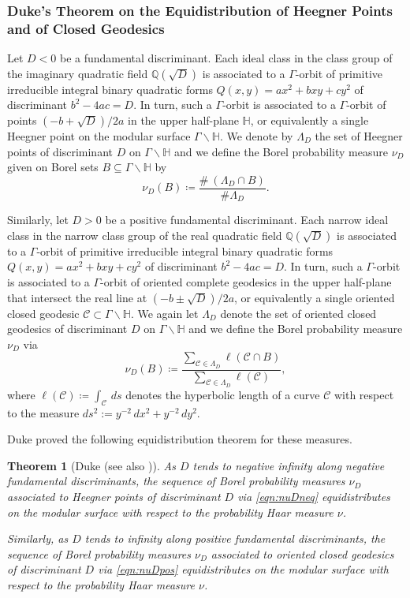 \documentclass[11pt,a4paper]{amsart}
\newcommand{\CC}{\mathcal{C}}
\newcommand{\Hb}{\mathbb{H}}
\newcommand{\Q}{\mathbb{Q}}
\numberwithin{equation}{section}
\newtheorem{theorem}[equation]{Theorem}
\theoremstyle{remark}
\theoremstyle{definition}
\begin{document}
\subsubsection{Duke's Theorem on the Equidistribution of Heegner Points and of Closed Geodesics}

Let $D < 0$ be a fundamental discriminant. Each ideal class in the class group of the imaginary quadratic field $\Q(\sqrt{D})$ is associated to a $\Gamma$-orbit of primitive irreducible integral binary quadratic forms $Q(x,y) = ax^2 + bxy + cy^2$ of discriminant $b^2 - 4ac = D$. In turn, such a $\Gamma$-orbit is associated to a $\Gamma$-orbit of points $(-b + \sqrt{D})/2a$ in the upper half-plane $\Hb$, or equivalently a single Heegner point on the modular surface $\Gamma \backslash \Hb$. We denote by $\Lambda_D$ the set of Heegner points of discriminant $D$ on $\Gamma \backslash \Hb$ and we define the Borel probability measure $\nu_D$ given on Borel sets $B \subseteq \Gamma \backslash \Hb$ by
\begin{equation}
\label{eqn:nuDneq}
\nu_D(B) \coloneqq \frac{\#\ (\Lambda_D \cap B)}{\# \Lambda_D}.
\end{equation}

Similarly, let $D > 0$ be a positive fundamental discriminant. Each narrow ideal class in the narrow class group of the real quadratic field $\Q(\sqrt{D})$ is associated to a $\Gamma$-orbit of primitive irreducible integral binary quadratic forms $Q(x,y) = ax^2 + bxy + cy^2$ of discriminant $b^2 - 4ac = D$. In turn, such a $\Gamma$-orbit is associated to a $\Gamma$-orbit of oriented complete geodesics in the upper half-plane that intersect the real line at $(-b \pm \sqrt{D})/2a$, or equivalently a single oriented closed geodesic $\CC \subset \Gamma \backslash \Hb$. We again let $\Lambda_D$ denote the set of oriented closed geodesics of discriminant $D$ on $\Gamma \backslash \Hb$ and we define the Borel probability measure $\nu_D$ via
\begin{equation}
\label{eqn:nuDpos}
\nu_D(B) \coloneqq \frac{\sum_{\CC \in \Lambda_D} \ell(\CC \cap B)}{\sum_{\CC \in \Lambda_D} \ell(\CC)},
\end{equation}
where $\ell(\CC) \coloneqq \int_{\CC} \, ds$ denotes the hyperbolic length of a curve $\CC$ with respect to the measure $ds^2 := y^{-2} \, dx^2 + y^{-2} \, dy^2$.\

Duke proved the following equidistribution theorem for these measures.

\begin{theorem}[{Duke \cite{Duk88} (see also \cite{ELMV12})}]
As $D$ tends to negative infinity along negative fundamental discriminants, the sequence of Borel probability measures $\nu_D$ associated to Heegner points of discriminant $D$ via \eqref{eqn:nuDneq} equidistributes on the modular surface with respect to the probability Haar measure $\nu$.

Similarly, as $D$ tends to infinity along positive fundamental discriminants, the sequence of Borel probability measures $\nu_D$ associated to oriented closed geodesics of discriminant $D$ via \eqref{eqn:nuDpos} equidistributes on the modular surface with respect to the probability Haar measure $\nu$.
\end{theorem}
\end{document}
